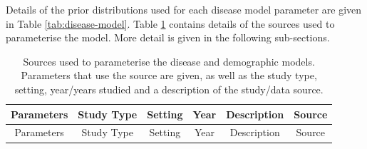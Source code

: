\documentclass[11pt,twoside]{bristolthesis}
\begin{document}
  Details of the prior distributions used for each disease model parameter are given in Table \ref{tab:disease-model}. Table \ref{tab:sources-tab} contains details of the sources used to parameterise the model. More detail is given in the following sub-sections.
  \begin{longtable}[]{@{}cccccc@{}}
  \caption{\label{tab:sources-tab} Sources used to parameterise the disease and demographic models. Parameters that use the source are given, as well as the study type, setting, year/years studied and a description of the study/data source.}\tabularnewline
  \toprule
  \begin{minipage}[b]{0.21\columnwidth}\centering
  Parameters\strut
  \end{minipage} & \begin{minipage}[b]{0.10\columnwidth}\centering
  Study Type\strut
  \end{minipage} & \begin{minipage}[b]{0.07\columnwidth}\centering
  Setting\strut
  \end{minipage} & \begin{minipage}[b]{0.07\columnwidth}\centering
  Year\strut
  \end{minipage} & \begin{minipage}[b]{0.27\columnwidth}\centering
  Description\strut
  \end{minipage} & \begin{minipage}[b]{0.11\columnwidth}\centering
  Source\strut
  \end{minipage}\tabularnewline
  \midrule
  \endfirsthead
  \toprule
  \begin{minipage}[b]{0.21\columnwidth}\centering
  Parameters\strut
  \end{minipage} & \begin{minipage}[b]{0.10\columnwidth}\centering
  Study Type\strut
  \end{minipage} & \begin{minipage}[b]{0.07\columnwidth}\centering
  Setting\strut
  \end{minipage} & \begin{minipage}[b]{0.07\columnwidth}\centering
  Year\strut
  \end{minipage} & \begin{minipage}[b]{0.27\columnwidth}\centering
  Description\strut
  \end{minipage} & \begin{minipage}[b]{0.11\columnwidth}\centering
  Source\strut
  \end{minipage}\tabularnewline

\end{longtable}
\end{document}
